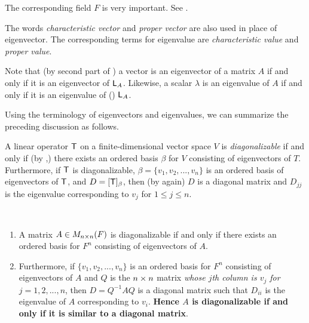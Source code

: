 \begin{remark} \label{remark 5.1.3}
The corresponding field \(F\) is very important.
See .
\end{remark}

\begin{remark} \label{remark 5.1.4}
The words \emph{characteristic vector} and \emph{proper vector} are also used in place of eigenvector.
The corresponding terms for eigenvalue are \emph{characteristic value} and \emph{proper value}.
\end{remark}

\begin{remark} \label{remark 5.1.5}
Note that (by second part of ) a vector is an eigenvector of a matrix \(A\) if and only if it is an eigenvector of \(\textsf{L}_A\).
Likewise, a scalar \(\lambda\) is an eigenvalue of \(A\) if and only if it is an eigenvalue of (\LTRAN{}) \(\textsf{L}_A\).
\end{remark}

Using the terminology of eigenvectors and eigenvalues, we can summarize the preceding discussion as follows.

\begin{theorem} \label{thm 5.1}
A linear operator \(\textsf{T}\) on a finite-dimensional vector space \(V\) is \emph{diagonalizable} if and only if (by ,) there exists an ordered basis \(\beta\) for \(V\) consisting of eigenvectors of \(T\).
Furthermore, if \(\textsf{T}\) is diagonalizable, \(\beta = \{ v_1, v_2, ..., v_n \}\) is an ordered basis of eigenvectors of \(\textsf{T}\), and \(D = [\textsf{T}]_{\beta}\), then (by  again) \(D\) is a diagonal matrix and \(D_{jj}\) is the eigenvalue corresponding to \(v_j\) for \(1 \le j \le n\).
\end{theorem}

\begin{corollary} \label{corollary 5.1.1} \ 

\begin{enumerate}
\item A matrix \(A \in M_{n \times n}(F)\) is diagonalizable if and only if there exists an ordered basis for \(F^n\) consisting of eigenvectors of \(A\).

\item
Furthermore, if \(\{ v_1, v_2, ..., v_n \}\) is an ordered basis for \(F^n\) consisting of eigenvectors of \(A\) and \(Q\) is the \(n \times n\) matrix \emph{whose \(j\)th column is \(v_j\) for \(j = 1, 2, ..., n\)}, then \(D = Q^{-1} A Q\) is a diagonal matrix such that \(D_{ii}\) is the eigenvalue of \(A\) corresponding to \(v_i\).
\textbf{Hence \(A\) is diagonalizable if and only if it is similar to a diagonal matrix}.
\end{enumerate}

\end{corollary}

